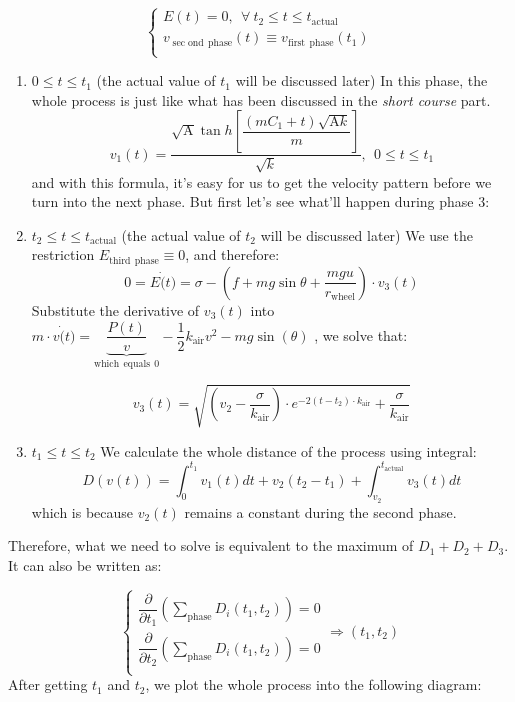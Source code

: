 \documentclass{article}
\begin{document}
\begin{itemize}
\begin{itemize}
							$$
							\begin{cases}
								E\left( t \right) =0,\:\:\forall \:t_2\le t\le t_{\mathrm{actual}}\\
								v_{\sec\mathrm{ond}\:\:\mathrm{phase}}\left( t \right) \equiv v_{\mathrm{first}\:\:\mathrm{phase}}\left( t_1 \right)\\
							\end{cases}
							$$
							\begin{enumerate}
								\item \(0\leq t\leq t_1\) (the actual value of \(t_1\) will be discussed later)
									In this phase, the whole process is just like what has been discussed in the \textit{short course} part.
									\[v_1(t)=\dfrac{\sqrt{\mathrm{A}} \tan  h \left[\dfrac{\left(m C _1+t\right)\sqrt{\mathrm{A}k}}{m}\right]}{\sqrt{ k }},\:\:0\leq t\leq t_1\]
									and with this formula, it's easy for us to get the velocity pattern before we turn into the next phase. But first let's see what'll happen during phase 3:
								\item \(t_2\leq t\leq t_{\mathrm{actual}}\) (the actual value of \(t_2\) will be discussed later)
									We use the restriction \(E_{\mathrm{third\:\:phase}}\equiv 0\), and therefore:
									\[0=E \dot(t)=\sigma-\left(f+mg\sin\theta+\dfrac{mgu}{r_{\mathrm{wheel}}}\right)\cdot v_3(t)\]
									Substitute the derivative of \(v_3(t)\) into \(m \cdot v\dot(t)=\underset{\mathrm{which\:\:equals\:\:}0}{\underbrace{\dfrac{P (t)}{v}}}-\dfrac{1}{2} k_{\mathrm{air}} v^2-mg\sin\left(\theta\right)\)
									, we solve that:

									\[v_3\left( t \right) =\sqrt{\left( v_2-\dfrac{\sigma}{k_{\mathrm{air}}} \right) \cdot e^{-2\left( t-t_2 \right) \cdot k_{\mathrm{air}}}+\dfrac{\sigma}{k_{\mathrm{air}}}}\]


								\item \(t_1\leq t\leq t_2\)
									We calculate the whole distance of the process using integral:
									\[D(v(t))=\int_0^{t_1}v_1(t)dt+v_2(t_2-t_1)+\int_{v_2}^{t_{\mathrm{actual}}}v_3(t)dt\]
									which is because \(v_2(t)\) remains a constant during the second phase.
								\end{enumerate}
							Therefore, what we need to solve is equivalent to the maximum of \(D_1+D_2+D_3\). It can also be written as:

							\[
								\begin{cases}
									\dfrac{\partial}{\partial t_1}\left( \displaystyle\sum\limits_{\mathrm{phase}}{D_i\left( t_1,t_2 \right)} \right) =0\\
									\dfrac{\partial}{\partial t_2}\left( \displaystyle\sum\limits_{\mathrm{phase}}{D_i\left( t_1,t_2 \right)} \right) =0\\
								\end{cases}\Rightarrow \left( t_1,t_2 \right)
							\]
							After getting \(t_1\) and \(t_2\), we plot the whole process into the following diagram:


\end{itemize}
\end{itemize}
\end{document}
